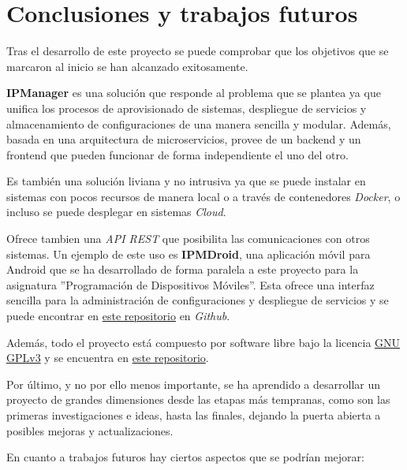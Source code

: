 \chapter{Conclusiones y trabajos futuros}

Tras el desarrollo de este proyecto se puede comprobar que los objetivos que se marcaron al inicio se han alcanzado exitosamente.

\textbf{IPManager} es una solución que responde al problema que se plantea ya que unifica los procesos de aprovisionado de sistemas, despliegue de servicios y almacenamiento de configuraciones de una manera sencilla y modular. Además, basada en una arquitectura de microservicios, provee de un backend y un frontend que pueden funcionar de forma independiente el uno del otro.

Es también una solución liviana y no intrusiva ya que se puede instalar en sistemas con pocos recursos de manera local o a través de contenedores \textit{Docker}, o incluso se puede desplegar en sistemas \textit{Cloud}.

Ofrece tambien una \textit{API REST} que posibilita las comunicaciones con otros sistemas. Un ejemplo de este uso es \textbf{IPMDroid}, una aplicación móvil para Android que se ha desarrollado de forma paralela a este proyecto para la asignatura ''Programación de Dispositivos Móviles''. Esta ofrece una interfaz sencilla para la administración de configuraciones y despliegue de servicios y se puede encontrar en \href{https://github.com/harvestcore/ipmdroid}{este repositorio} en \textit{Github}.

Además, todo el proyecto está compuesto por software libre bajo la licencia \href{https://www.gnu.org/licenses/gpl-3.0.html}{GNU GPLv3} y se encuentra en \href{https://github.com/harvestcore/tfg}{este repositorio}.

Por último, y no por ello menos importante, se ha aprendido a desarrollar un proyecto de grandes dimensiones desde las etapas más tempranas, como son las primeras investigaciones e ideas, hasta las finales, dejando la puerta abierta a posibles mejoras y actualizaciones.


\pagebreak
En cuanto a trabajos futuros hay ciertos aspectos que se podrían mejorar:

